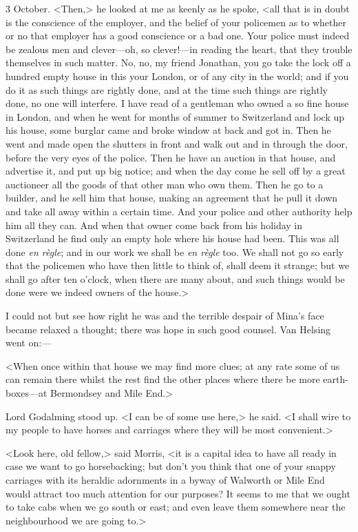 \begin{diary}{3 October.}
<Then,> he looked at me as keenly as he spoke, <all that is in doubt is the conscience of the employer, and the belief of your policemen as to whether or no that employer has a good conscience or a bad one. Your police must indeed be zealous men and clever—oh, so clever!—in reading the heart, that they trouble themselves in such matter. No, no, my friend Jonathan, you go take the lock off a hundred empty house in this your London, or of any city in the world; and if you do it as such things are rightly done, and at the time such things are rightly done, no one will interfere. I have read of a gentleman who owned a so fine house in London, and when he went for months of summer to Switzerland and lock up his house, some burglar came and broke window at back and got in. Then he went and made open the shutters in front and walk out and in through the door, before the very eyes of the police. Then he have an auction in that house, and advertise it, and put up big notice; and when the day come he sell off by a great auctioneer all the goods of that other man who own them. Then he go to a builder, and he sell him that house, making an agreement that he pull it down and take all away within a certain time. And your police and other authority help him all they can. And when that owner come back from his holiday in Switzerland he find only an empty hole where his house had been. This was all done \textit{en règle}; and in our work we shall be \textit{en règle} too. We shall not go so early that the policemen who have then little to think of, shall deem it strange; but we shall go after ten o'clock, when there are many about, and such things would be done were we indeed owners of the house.>

I could not but see how right he was and the terrible despair of Mina's face became relaxed a thought; there was hope in such good counsel. Van Helsing went on:—

<When once within that house we may find more clues; at any rate some of us can remain there whilst the rest find the other places where there be more earth-boxes—at Bermondsey and Mile End.>

Lord Godalming stood up. <I can be of some use here,> he said. <I shall wire to my people to have horses and carriages where they will be most convenient.>

<Look here, old fellow,> said Morris, <it is a capital idea to have all ready in case we want to go horsebacking; but don't you think that one of your snappy carriages with its heraldic adornments in a byway of Walworth or Mile End would attract too much attention for our purposes? It seems to me that we ought to take cabs when we go south or east; and even leave them somewhere near the neighbourhood we are going to.>


\end{diary}

